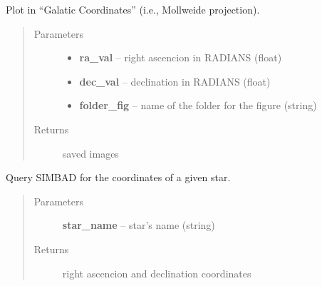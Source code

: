 \documentclass[letterpaper,10pt,english]{sphinxmanual}
\begin{document}
\begin{fulllineitems}
\label{index:BeFaVOr_web.plot_gal}
Plot in ``Galatic Coordinates'' (i.e., Mollweide projection).
\begin{quote}\begin{description}
\item[{Parameters}] \leavevmode\begin{itemize}
\item {} 
\textbf{ra\_val} -- right ascencion in RADIANS (float)

\item {} 
\textbf{dec\_val} -- declination in RADIANS (float)

\item {} 
\textbf{folder\_fig} -- name of the folder for the figure (string)

\end{itemize}

\item[{Returns}] \leavevmode
saved images

\end{description}\end{quote}

\end{fulllineitems}


\begin{fulllineitems}
\label{index:BeFaVOr_web.read_simbad_coodr}
Query SIMBAD for the coordinates of a given star.
\begin{quote}\begin{description}
\item[{Parameters}] \leavevmode
\textbf{star\_name} -- star's name (string)

\item[{Returns}] \leavevmode
right ascencion and declination coordinates

\end{description}\end{quote}

\end{fulllineitems}

\end{document}

